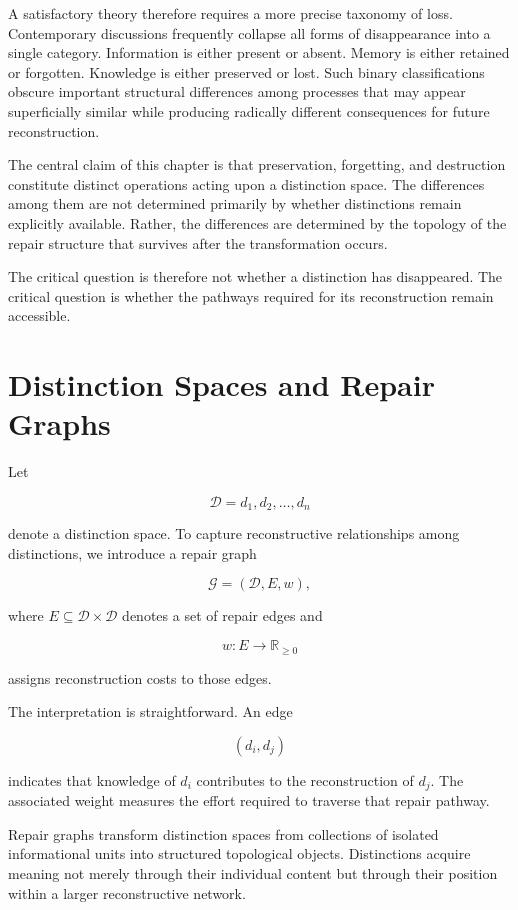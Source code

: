\documentclass[12pt,oneside]{book}
\theoremstyle{plain} \newtheorem{theorem}{Theorem}[chapter] \newtheorem{lemma}[theorem]{Lemma} \newtheorem{proposition}[theorem]{Proposition} \newtheorem{corollary}[theorem]{Corollary}
\theoremstyle{definition} \newtheorem{definition}[theorem]{Definition} \newtheorem{axiom}[theorem]{Axiom} \newtheorem{construction}[theorem]{Construction}
\theoremstyle{remark} \newtheorem{remark}[theorem]{Remark} \newtheorem{example}[theorem]{Example}
\newcommand{\D}{\mathcal{D}} \newcommand{\R}{\mathcal{R}} \newcommand{\F}{\mathcal{F}} \newcommand{\U}{\mathcal{U}} \newcommand{\M}{\mathcal{M}} \newcommand{\G}{\Gamma}
\begin{document}
A satisfactory theory therefore requires a more precise taxonomy of loss. Contemporary discussions frequently collapse all forms of disappearance into a single category. Information is either present or absent. Memory is either retained or forgotten. Knowledge is either preserved or lost. Such binary classifications obscure important structural differences among processes that may appear superficially similar while producing radically different consequences for future reconstruction.

The central claim of this chapter is that preservation, forgetting, and destruction constitute distinct operations acting upon a distinction space. The differences among them are not determined primarily by whether distinctions remain explicitly available. Rather, the differences are determined by the topology of the repair structure that survives after the transformation occurs.

The critical question is therefore not whether a distinction has disappeared. The critical question is whether the pathways required for its reconstruction remain accessible.

\section{Distinction Spaces and Repair Graphs}

Let

\[
\D
=
{d_1,d_2,\ldots,d_n}
\]

denote a distinction space. To capture reconstructive relationships among distinctions, we introduce a repair graph

\[
\mathcal G
=
(\D,E,w),
\]

where $E\subseteq \D\times\D$ denotes a set of repair edges and

\[
w:E\rightarrow\mathbb R_{\geq0}
\]

assigns reconstruction costs to those edges.

The interpretation is straightforward. An edge

\[
(d_i,d_j)
\]

indicates that knowledge of $d_i$ contributes to the reconstruction of $d_j$. The associated weight measures the effort required to traverse that repair pathway.

Repair graphs transform distinction spaces from collections of isolated informational units into structured topological objects. Distinctions acquire meaning not merely through their individual content but through their position within a larger reconstructive network.
\end{document}
